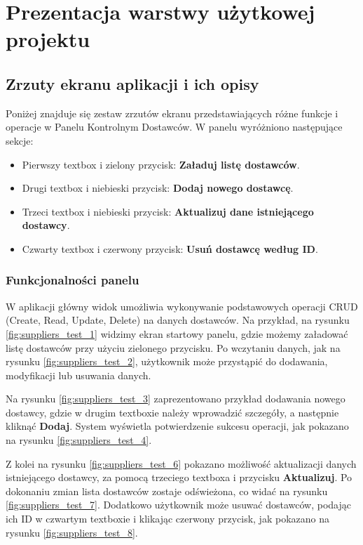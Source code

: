 \chapter{Prezentacja warstwy użytkowej projektu}
\section{Zrzuty ekranu aplikacji i ich opisy}

Poniżej znajduje się zestaw zrzutów ekranu przedstawiających różne funkcje i operacje w Panelu Kontrolnym Dostawców. W panelu wyróżniono następujące sekcje:
\begin{itemize}
    \item Pierwszy textbox i zielony przycisk: \textbf{Załaduj listę dostawców}.
    \item Drugi textbox i niebieski przycisk: \textbf{Dodaj nowego dostawcę}.
    \item Trzeci textbox i niebieski przycisk: \textbf{Aktualizuj dane istniejącego dostawcy}.
    \item Czwarty textbox i czerwony przycisk: \textbf{Usuń dostawcę według ID}.
\end{itemize}

\subsection{Funkcjonalności panelu}
W aplikacji główny widok umożliwia wykonywanie podstawowych operacji CRUD (Create, Read, Update, Delete) na danych dostawców. Na przykład, na rysunku \ref{fig:suppliers_test_1} widzimy ekran startowy panelu, gdzie możemy załadować listę dostawców przy użyciu zielonego przycisku. Po wczytaniu danych, jak na rysunku \ref{fig:suppliers_test_2}, użytkownik może przystąpić do dodawania, modyfikacji lub usuwania danych.

Na rysunku \ref{fig:suppliers_test_3} zaprezentowano przykład dodawania nowego dostawcy, gdzie w drugim textboxie należy wprowadzić szczegóły, a następnie kliknąć \textbf{Dodaj}. System wyświetla potwierdzenie sukcesu operacji, jak pokazano na rysunku \ref{fig:suppliers_test_4}.

Z kolei na rysunku \ref{fig:suppliers_test_6} pokazano możliwość aktualizacji danych istniejącego dostawcy, za pomocą trzeciego textboxa i przycisku \textbf{Aktualizuj}. Po dokonaniu zmian lista dostawców zostaje odświeżona, co widać na rysunku \ref{fig:suppliers_test_7}. Dodatkowo użytkownik może usuwać dostawców, podając ich ID w czwartym textboxie i klikając czerwony przycisk, jak pokazano na rysunku \ref{fig:suppliers_test_8}.

